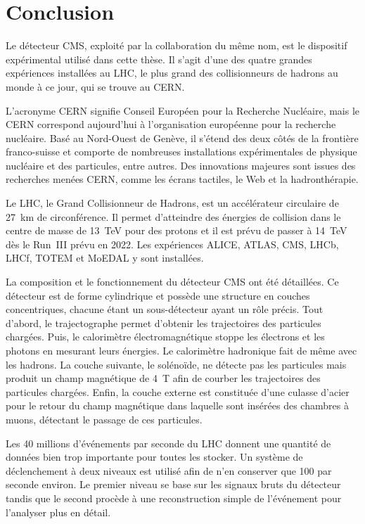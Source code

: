 \section{Conclusion}\label{chapter-LHC-section-conclusion}
Le détecteur CMS, exploité par la collaboration du même nom, est le dispositif expérimental utilisé dans cette thèse.
Il s'agit d'une des quatre grandes expériences installées au LHC, le plus grand des collisionneurs de hadrons au monde à ce jour, qui se trouve au CERN.
\par L'acronyme \og CERN \fg{} signifie Conseil Européen pour la Recherche Nucléaire, mais le CERN correspond aujourd'hui à l'organisation européenne pour la recherche nucléaire.
Basé au Nord-Ouest de Genève, il s'étend des deux côtés de la frontière franco-suisse et comporte de nombreuses installations expérimentales de physique nucléaire et des particules, entre autres.
Des innovations majeures sont issues des recherches menées CERN, comme les écrans tactiles, le Web et la hadronthérapie.
\par Le LHC, le Grand Collisionneur de Hadrons, est un accélérateur circulaire de \SI{27}{\kilo\meter} de circonférence.
Il permet d'atteindre des énergies de collision dans le centre de masse de \SI{13}{\TeV} pour des protons et il est prévu de passer à \SI{14}{\TeV} dès le Run~III prévu en 2022.
Les expériences ALICE, ATLAS, CMS, LHCb, LHCf, TOTEM et MoEDAL y sont installées.
\par La composition et le fonctionnement du détecteur CMS ont été détaillées.
Ce détecteur est de forme cylindrique et possède une structure en couches concentriques, chacune étant un sous-détecteur ayant un rôle précis.
Tout d'abord, le trajectographe permet d'obtenir les trajectoires des particules chargées.
Puis, le calorimètre électromagnétique stoppe les électrons et les photons en mesurant leurs énergies.
Le calorimètre hadronique fait de même avec les hadrons.
La couche suivante, le solénoïde, ne détecte pas les particules mais produit un champ magnétique de \SI{4}{\tesla} afin de courber les trajectoires des particules chargées.
Enfin, la couche externe est constituée d'une culasse d'acier pour le retour du champ magnétique dans laquelle sont insérées des chambres à muons, détectant le passage de ces particules.
\par Les 40 millions d'événements par seconde du LHC donnent une quantité de données bien trop importante pour toutes les stocker.
Un système de déclenchement à deux niveaux est utilisé afin de n'en conserver que 100 par seconde environ.
Le premier niveau se base sur les signaux bruts du détecteur tandis que le second procède à une reconstruction simple de l'événement pour l'analyser plus en détail.
